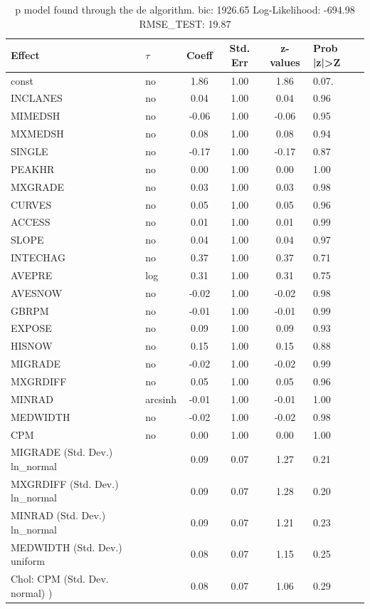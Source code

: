 \begin{table}
	\caption{p model found through the de algorithm. bic: 1926.65 Log-Likelihood: -694.98 RMSE_TEST: 19.87}
	\begin{center}
		\begin{tabular}{|l|l|c|c|c|l|}
			\hline
			Effect & $\tau$ & Coeff & Std. Err & z-values & Prob |z|>Z \\
			\hline
			const & no & 1.86 & 1.00 & 1.86 & 0.07. \\
			\hline
			INCLANES & no & 0.04 & 1.00 & 0.04 & 0.96 \\
			\hline
			MIMEDSH & no & -0.06 & 1.00 & -0.06 & 0.95 \\
			\hline
			MXMEDSH & no & 0.08 & 1.00 & 0.08 & 0.94 \\
			\hline
			SINGLE & no & -0.17 & 1.00 & -0.17 & 0.87 \\
			\hline
			PEAKHR & no & 0.00 & 1.00 & 0.00 & 1.00 \\
			\hline
			MXGRADE & no & 0.03 & 1.00 & 0.03 & 0.98 \\
			\hline
			CURVES & no & 0.05 & 1.00 & 0.05 & 0.96 \\
			\hline
			ACCESS & no & 0.01 & 1.00 & 0.01 & 0.99 \\
			\hline
			SLOPE & no & 0.04 & 1.00 & 0.04 & 0.97 \\
			\hline
			INTECHAG & no & 0.37 & 1.00 & 0.37 & 0.71 \\
			\hline
			AVEPRE & log & 0.31 & 1.00 & 0.31 & 0.75 \\
			\hline
			AVESNOW & no & -0.02 & 1.00 & -0.02 & 0.98 \\
			\hline
			GBRPM & no & -0.01 & 1.00 & -0.01 & 0.99 \\
			\hline
			EXPOSE & no & 0.09 & 1.00 & 0.09 & 0.93 \\
			\hline
			HISNOW & no & 0.15 & 1.00 & 0.15 & 0.88 \\
			\hline
			MIGRADE & no & -0.02 & 1.00 & -0.02 & 0.99 \\
			\hline
			MXGRDIFF & no & 0.05 & 1.00 & 0.05 & 0.96 \\
			\hline
			MINRAD & arcsinh & -0.01 & 1.00 & -0.01 & 1.00 \\
			\hline
			MEDWIDTH & no & -0.02 & 1.00 & -0.02 & 0.98 \\
			\hline
			CPM & no & 0.00 & 1.00 & 0.00 & 1.00 \\
			\hline
			MIGRADE (Std. Dev.) ln_normal &  & 0.09 & 0.07 & 1.27 & 0.21 \\
			\hline
			MXGRDIFF (Std. Dev.) ln_normal &  & 0.09 & 0.07 & 1.28 & 0.20 \\
			\hline
			MINRAD (Std. Dev.) ln_normal &  & 0.09 & 0.07 & 1.21 & 0.23 \\
			\hline
			MEDWIDTH (Std. Dev.) uniform &  & 0.08 & 0.07 & 1.15 & 0.25 \\
			\hline
			 Chol: CPM (Std. Dev. normal) ) &  & 0.08 & 0.07 & 1.06 & 0.29 \\
			\hline
		\end{tabular}
	\end{center}
\end{table}